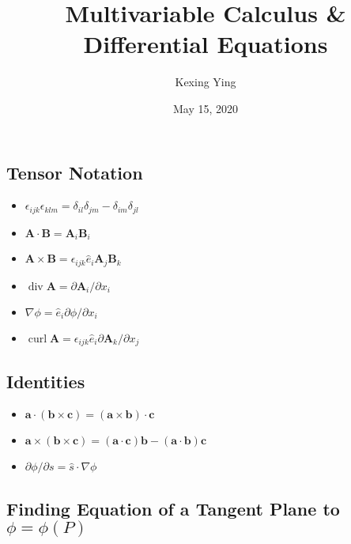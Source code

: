 \documentclass[
]{article}
\title{Multivariable Calculus \& Differential Equations}
\author{Kexing Ying}
\date{May 15, 2020}
\theoremstyle{definition}
\theoremstyle{definition}
\begin{document}
\maketitle

\hypertarget{tensor-notation}{%
\subsection{Tensor Notation}\label{tensor-notation}}

\begin{itemize}
  \item \(\epsilon_{ijk}\epsilon_{klm} = \delta_{il}\delta_{jm} - \delta_{im}\delta_{jl}\)  
  \item \(\mathbf{A} \cdot \mathbf{B} = \mathbf{A}_i \mathbf{B}_i\)
  \item \(\mathbf{A} \times \mathbf{B} = \epsilon_{ijk}\hat{e}_i\mathbf{A}_j\mathbf{B}_k\)
  \item \(\mathop{\mathrm{div}}\mathbf{A} = \partial \mathbf{A}_i / \partial x_i\)
  \item \(\nabla \phi = \hat{e}_i \partial \phi / \partial x_i\)
  \item \(\mathop{\mathrm{curl}}\mathbf{A} = \epsilon_{ijk} \hat{e}_i \partial \mathbf{A}_k / \partial x_j\)
\end{itemize}

\hypertarget{identities}{%
\subsection{Identities}\label{identities}}

\begin{itemize}
  \item \(\mathbf{a} \cdot (\mathbf{b} \times \mathbf{c}) = (\mathbf{a} \times 
    \mathbf{b}) \cdot \mathbf{c}\)
  \item \(\mathbf{a} \times (\mathbf{b} \times \mathbf{c}) = (\mathbf{a} \cdot 
    \mathbf{c}) \mathbf{b} - (\mathbf{a} \cdot \mathbf{b})\mathbf{c}\)
  \item \(\partial \phi / \partial s = \hat{s} \cdot \nabla \phi\)
\end{itemize}

\hypertarget{finding-equation-of-a-tangent-plane-to-phi-phip}{%
\subsection{\texorpdfstring{Finding Equation of a Tangent Plane to
\(\phi = \phi(P)\)}{Finding Equation of a Tangent Plane to \textbackslash phi = \textbackslash phi(P)}}\label{finding-equation-of-a-tangent-plane-to-phi-phip}}
\end{document}
